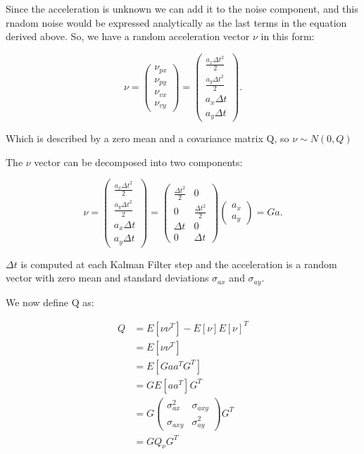 \documentclass[11pt, a4paper]{article}
\begin{document}
Since the acceleration is unknown we can add it to the noise component, and this rnadom noise would be expressed analytically as the last terms in the equation derived above. So, we have a random acceleration vector $\nu$ in this form:

\[
\nu=\left(\begin{array}{c}{\nu_{p x}} \\ {\nu_{p y}} \\ {\nu_{v x}} \\ {\nu_{v y}}\end{array}\right)=\left(\begin{array}{c}{\frac{a_{x} \Delta t^{2}}{2}} \\ {\frac{a_{y} \Delta t^{2}}{2}} \\ {a_{x} \Delta t} \\ {a_{y} \Delta t}\end{array}\right)
.\] 

Which is described by a zero mean and a covariance matrix Q, so $\nu \sim N(0,Q)$


The $\nu$ vector can be decomposed into two components:

\[
\nu=\left(\begin{array}{c}{\frac{a_{x} \Delta t^{2}}{2}} \\ {\frac{a_{y} \Delta t^{2}}{2}} \\ {a_{x} \Delta t} \\ {a_{y} \Delta t}\end{array}\right)=\left(\begin{array}{cc}{\frac{\Delta t^{2}}{2}} & {0} \\ {0} & {\frac{\Delta t^{2}}{2}} \\ {\Delta t} & {0} \\ {0} & {\Delta t}\end{array}\right)\left(\begin{array}{l}{a_{x}} \\ {a_{y}}\end{array}\right)=G a
.\] 



$\Delta t$ is computed at each Kalman Filter step and the acceleration is a random vector with zero mean and standard deviations $\sigma_{ax}$ and $\sigma_{ay}$.


We now define Q as:


\begin{equation} \label{process_cov_matrix}
\begin{split}
	Q & = E[\nu \nu^T] - E[\nu]E[\nu]^T \\
	  & = E[\nu \nu^T] \\
	  & = E[G a a^T G^T] \\
	  & = GE[aa^T]G^T \\
	  & = G\left(\begin{array}{cc}{\sigma_{a x}^{2}} & {\sigma_{a x y}} \\ {\sigma_{a x y}} & {\sigma_{a y}^{2}}\end{array}\right) G^{T} \\
	  & = GQ_{\nu}G^T
\end{split}	
\end{equation}
\end{document}
